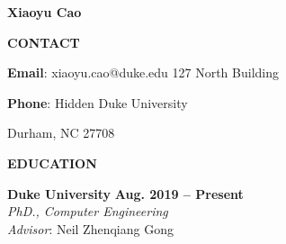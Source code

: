 \documentclass[11pt]{article}
\begin{document}
\begin{spacing}{1}

\begin{center}
 {\huge \textbf{Xiaoyu Cao}}
\end{center}
\vspace{-4mm}
\hspace{0.26cm}\makebox[\linewidth]{\rule{17.5cm}{1pt}}


\vspace{3mm}
{\bf \Large CONTACT}\\
\vspace{-4mm}
\begin{list}{}{\leftmargin=4em}
\item \textbf{Email}: xiaoyu.cao@duke.edu \hfill{127 North Building} \vspace{-6mm}\\
\item \textbf{Phone}: Hidden \hfill{Duke University}\vspace{-6mm} \\

\end{list}
\hfill{Durham, NC 27708} 


\vspace{3mm}
{\bf \Large EDUCATION}\\
\vspace{-4mm}
\begin{list}{}{\leftmargin=4em}

\item \textbf{Duke University} \hfill{\textbf{Aug. 2019 -- Present}} 	\\
\emph{PhD., Computer Engineering}\\
\emph{Advisor}: Neil Zhenqiang Gong


\end{list}
\end{spacing}
\end{document}
